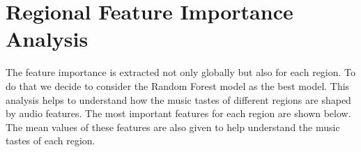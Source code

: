 \newpage

\section{Regional Feature Importance Analysis}


The feature importance is extracted not only globally but also for each region. To do that we decide to consider the Random Forest model as the best model.
This analysis helps to understand how the music tastes of different regions are shaped by audio features.
The most important features for each region are shown below. The mean values of these features are also given to help understand the music tastes of each region.


